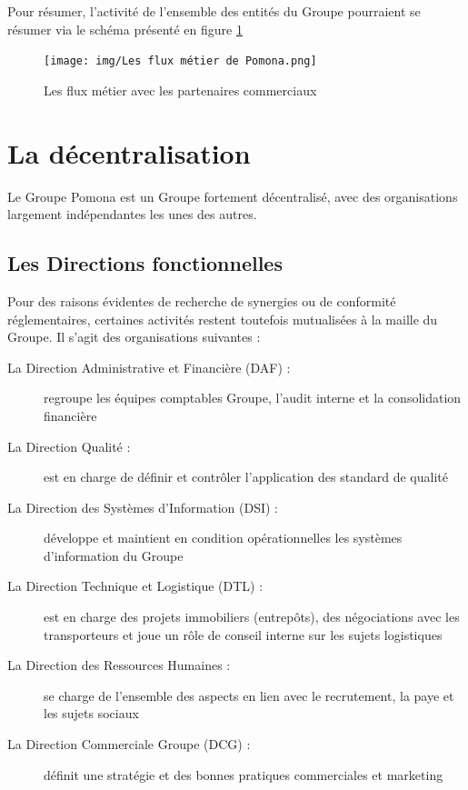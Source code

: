         Pour résumer, l'activité de l'ensemble des entités du Groupe pourraient se résumer via le schéma présenté en figure \ref{fig:flux metier}

        \begin{figure}[htbp]
            \begin{center}
            \texttt{[image: img/Les flux métier de Pomona.png]}
            \end{center}
            \caption{Les flux métier avec les partenaires commerciaux}
            \label{fig:flux metier}
        \end{figure}


        \section{La décentralisation}
        
        Le Groupe Pomona est un Groupe fortement décentralisé, avec des organisations largement indépendantes les unes des autres. 

            \subsection{Les Directions fonctionnelles}

            Pour des raisons évidentes de recherche de synergies ou de conformité réglementaires, certaines activités restent toutefois mutualisées à la maille du Groupe.
            Il s'agit des organisations suivantes :
            \begin{description}
                \item[La Direction Administrative et Financière (DAF) :] regroupe les équipes comptables Groupe, l'audit interne et la consolidation financière
                \item[La Direction Qualité :] est en charge de définir et contrôler l'application des standard de qualité
                \item[La Direction des Systèmes d'Information (DSI) :] développe et maintient en condition opérationnelles les systèmes d'information du Groupe
                \item[La Direction Technique et Logistique (DTL) :] est en charge des projets immobiliers (entrepôts), des négociations avec les transporteurs et joue un rôle de conseil interne sur les sujets logistiques
                \item[La Direction des Ressources Humaines :] se charge de l'ensemble des aspects en lien avec le recrutement, la paye et les sujets sociaux
                \item[La Direction Commerciale Groupe (DCG) :] définit une stratégie et des bonnes pratiques commerciales et marketing
            \end{description}

